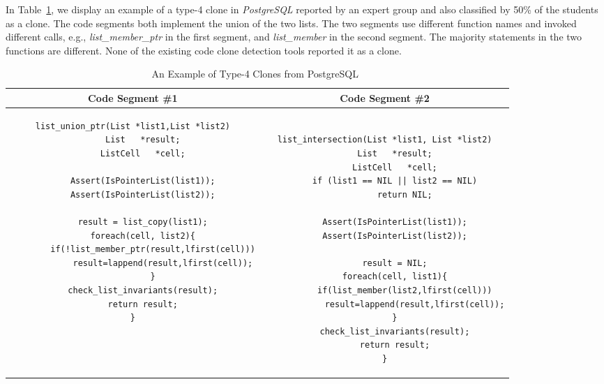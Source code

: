 \documentclass{sig-alternate}
\newcommand{\dan}[1]{\textcolor{blue}{{\it [Dan says: #1]}}}
\begin{document}
In Table~\ref{clone}, we display an example of a type-4 clone in {\it PostgreSQL} reported by an expert group and also classified by 50\% of the students as a clone. The code segments both implement the union of the two lists. The two segments use different function names and invoked different calls, e.g., {\it list\_member\_ptr} in the first segment, and {\it list\_member} in the second segment. The majority statements in the two functions are different. None of the existing code clone detection tools reported it as a clone.

\noindent
\begin{table}
\caption{An Example of Type-4 Clones from PostgreSQL~\label{clone}}
\vspace{2 mm}
\begin{tabular}{c | c}
\bfseries Code Segment \#1  & \bfseries Code Segment \#2 \\ \hline \hline
\begin{lstlisting}
list_union_ptr(List *list1,List *list2)
	List   *result;
	ListCell   *cell;

	Assert(IsPointerList(list1));
	Assert(IsPointerList(list2));

	result = list_copy(list1);
	foreach(cell, list2){
		if(!list_member_ptr(result,lfirst(cell)))
			result=lappend(result,lfirst(cell));
		}
	check_list_invariants(result);
	return result;
}
\end{lstlisting}
&
\begin{lstlisting}

list_intersection(List *list1, List *list2)
	List   *result;
	ListCell   *cell;
	if (list1 == NIL || list2 == NIL)
		return NIL;

	Assert(IsPointerList(list1));
	Assert(IsPointerList(list2));

	result = NIL;
	foreach(cell, list1){
		if(list_member(list2,lfirst(cell)))
			result=lappend(result,lfirst(cell));
	}
	check_list_invariants(result);
	return result;
}
\end{lstlisting}

\end{tabular}
\end{table}
\end{document}
